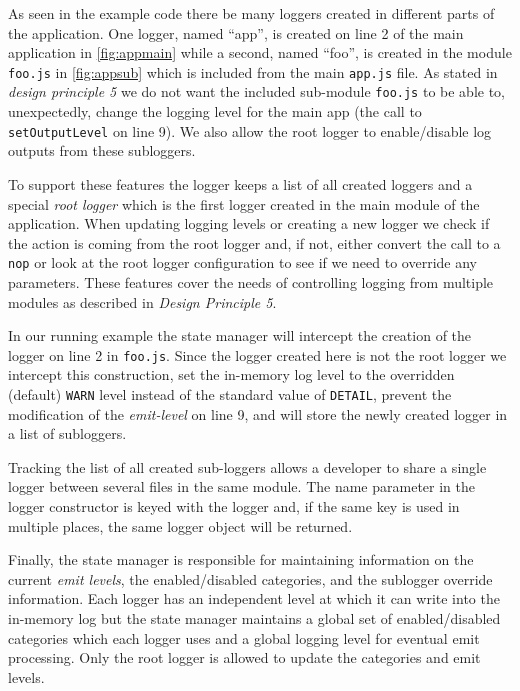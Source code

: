 As seen in the example code there be many loggers 
created in different parts of the application. One logger, named ``app'', is created on line 
2 of the main application in \autoref{fig:appmain} while a second, named ``foo'', is created 
in the module \texttt{foo.js} in \autoref{fig:appsub} which is included from 
the main \texttt{app.js} file. As stated in \emph{design principle 5} we 
do not want the included sub-module \texttt{foo.js} to be able to, unexpectedly, 
change the logging level for the main app (the call to \texttt{setOutputLevel} on 
line 9). We also allow the root logger to enable/disable log outputs 
from these subloggers. 

To support these features the \projn logger keeps a list of all created loggers 
and a special \emph{root logger} which is the first logger created in the main 
module of the application. When updating logging levels or creating a new logger 
we check if the action is coming from the root logger and, if not, either convert 
the call to a \texttt{nop} or look at the root logger configuration to see if 
we need to override any parameters. These features cover the needs of controlling 
logging from multiple modules as described in \emph{Design Principle 5}.

In our running example the state manager will intercept the creation of the logger 
on line 2 in \texttt{foo.js}. Since the logger created here is not the root logger
we intercept this construction, set the in-memory log level to 
the overridden (default) \texttt{WARN} level instead of the standard value of \texttt{DETAIL}, 
prevent the modification of the \emph{emit-level} on line 9, and will 
store the newly created logger in a list of subloggers. 

Tracking the list of all created sub-loggers allows a developer to share a 
single logger between several files in the same module. The name parameter in the 
logger constructor is keyed with the logger and, if the same key is used in multiple 
places, the same logger object will be returned.

Finally, the state manager is responsible for maintaining information on the current 
\emph{emit levels}, the enabled/disabled categories, and the sublogger override information. 
Each logger has an independent level at which it can write into the in-memory log but 
the state manager maintains a global set of enabled/disabled categories which each logger 
uses and a global logging level for eventual emit processing. Only the root logger is 
allowed to update the categories and emit levels. 

